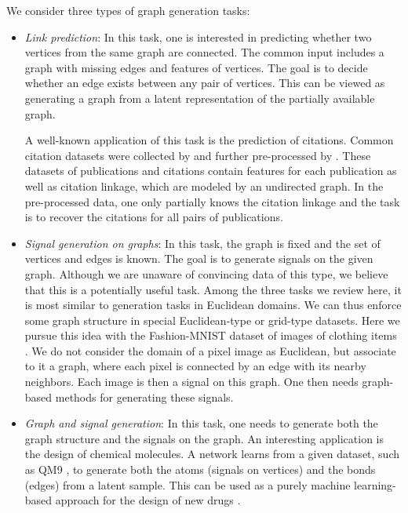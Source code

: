 \documentclass[conference]{IEEEtran}
\begin{document}
We consider three types of graph generation tasks:
\begin{itemize}[leftmargin=*]
    \item \emph{Link prediction}: In this task, one is interested in predicting whether two vertices from the same graph are connected. The common input includes a graph with missing edges and features of vertices. The goal is to decide whether an edge exists between any pair of vertices. This can be viewed as generating a graph from a latent representation of the partially available graph.  

    A well-known application of this task is the prediction of citations. Common citation datasets were collected by \cite{sen2008collective} and further pre-processed by \cite{kipf2016variational}. These datasets of publications and citations contain features for each publication as well as citation linkage, which are modeled by an undirected graph. In the pre-processed data, one only partially knows the citation linkage and the task is to recover the citations for all pairs of publications.
    
    \item \emph{Signal generation on graphs}: In this task, the graph is fixed and the set of vertices and edges is known. The goal is to generate signals on the given graph. Although we are unaware of convincing data of this type, we believe that this is a potentially useful task. Among the three tasks we review here, it is most similar to generation tasks in Euclidean domains. We can thus enforce some graph structure in special Euclidean-type or grid-type datasets.  Here we pursue this idea with the Fashion-MNIST dataset of images of clothing items \cite{xiao2017fashion}. We do not consider the domain of a  pixel image as Euclidean, but associate to it a graph, where each pixel is connected by an edge with its nearby neighbors. Each image is then a signal on this graph. One then needs graph-based methods for generating these signals. 
    
    \item \emph{Graph and signal generation}: In this task, one needs to generate both the graph structure and the signals on the graph. An interesting application is the design of chemical molecules. A network learns from a given dataset, such as QM9 \cite{ramakrishnan2014quantum}, to generate both the atoms (signals on vertices) and the bonds (edges) from a latent sample. This can be used as a purely machine learning-based approach for the design of new drugs \cite{olivecrona2017molecular}.
    
\end{itemize}
\end{document}
